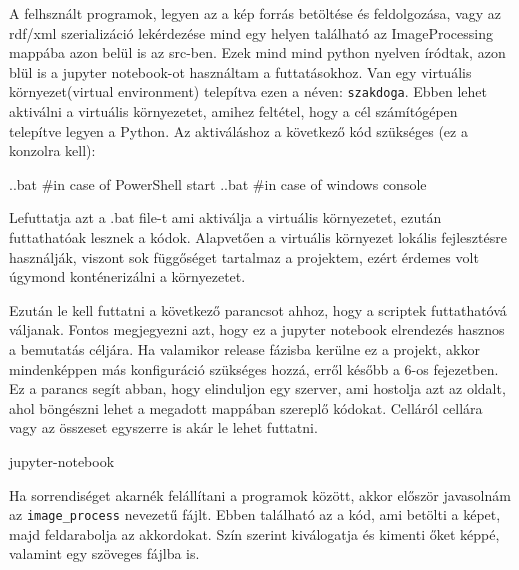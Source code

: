 
A felhsznált programok, legyen az a kép forrás betöltése és feldolgozása, vagy az rdf/xml szerializáció lekérdezése mind egy helyen található az ImageProcessing mappába azon belül is az src-ben. Ezek mind mind python nyelven íródtak, azon blül is a jupyter notebook-ot használtam a futtatásokhoz. Van egy virtuális környezet(virtual environment) telepítva ezen a néven: \texttt{szakdoga}. Ebben lehet aktiválni a virtuális környezetet, amihez feltétel, hogy a cél számítógépen telepítve legyen a Python. Az aktiváláshoz a következő kód szükséges (ez a konzolra kell):
\begin{python}
.\szakdoga\Scripts\activate.bat #in case of PowerShell
start .\szakdoga\Scripts\activate.bat #in case of windows console
\end{python}
Lefuttatja azt a .bat file-t ami aktiválja a virtuális környezetet, ezután futtathatóak lesznek a kódok. Alapvetően a virtuális környezet  lokális fejlesztésre használják, viszont sok függőséget tartalmaz a projektem, ezért érdemes volt úgymond konténerizálni a környezetet.
\par
Ezután le kell futtatni a következő parancsot ahhoz, hogy a scriptek futtathatóvá váljanak. Fontos megjegyezni azt, hogy ez a jupyter notebook elrendezés hasznos a bemutatás céljára. Ha valamikor release fázisba kerülne ez a projekt, akkor mindenképpen más konfiguráció szükséges hozzá, erről később a 6-os fejezetben. Ez a parancs segít abban, hogy elinduljon egy szerver, ami hostolja azt az oldalt, ahol böngészni lehet a megadott mappában szereplő kódokat. Celláról cellára vagy az összeset egyszerre is akár le lehet futtatni.
\begin{python}
jupyter-notebook
\end{python}
\par
Ha sorrendiséget akarnék felállítani a programok között, akkor először javasolnám az \texttt{image\_process} nevezetű fájlt. Ebben található az a kód, ami betölti a képet, majd feldarabolja az akkordokat. Szín szerint kiválogatja és kimenti őket képpé, valamint egy szöveges fájlba is.